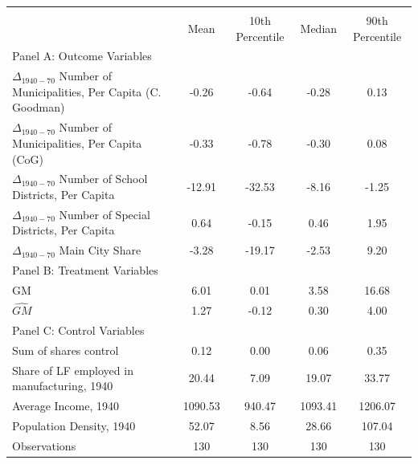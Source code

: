  \begin{tabular}{l*{4}{c}} \toprule
                &\multicolumn{4}{c}{}                   \\
                &     Mean&10th Percentile&   Median&90th Percentile\\
\cmidrule(lr){1-5}
\multicolumn{5}{l}{Panel A: Outcome Variables}\\
\cmidrule(lr){1-5}
$\Delta_{1940-70}$ Number of Municipalities, Per Capita (C. Goodman)&    -0.26&    -0.64&    -0.28&     0.13\\
$\Delta_{1940-70}$ Number of Municipalities, Per Capita (CoG)&    -0.33&    -0.78&    -0.30&     0.08\\
$\Delta_{1940-70}$ Number of School Districts, Per Capita&   -12.91&   -32.53&    -8.16&    -1.25\\
$\Delta_{1940-70}$ Number of Special Districts, Per Capita&     0.64&    -0.15&     0.46&     1.95\\
$\Delta_{1940-70}$ Main City Share&    -3.28&   -19.17&    -2.53&     9.20\\
\cmidrule(lr){1-5}
\multicolumn{5}{l}{Panel B: Treatment Variables}\\
\cmidrule(lr){1-5}
GM              &     6.01&     0.01&     3.58&    16.68\\
$\widehat{GM}$  &     1.27&    -0.12&     0.30&     4.00\\
\cmidrule(lr){1-5}
\multicolumn{5}{l}{Panel C: Control Variables}\\
\cmidrule(lr){1-5}
Sum of shares control&     0.12&     0.00&     0.06&     0.35\\
Share of LF employed in manufacturing, 1940&    20.44&     7.09&    19.07&    33.77\\
Average Income, 1940&  1090.53&   940.47&  1093.41&  1206.07\\
Population Density, 1940&    52.07&     8.56&    28.66&   107.04\\
\midrule Observations    &      130   &      130   &      130   &      130   \\ \bottomrule \end{tabular}

